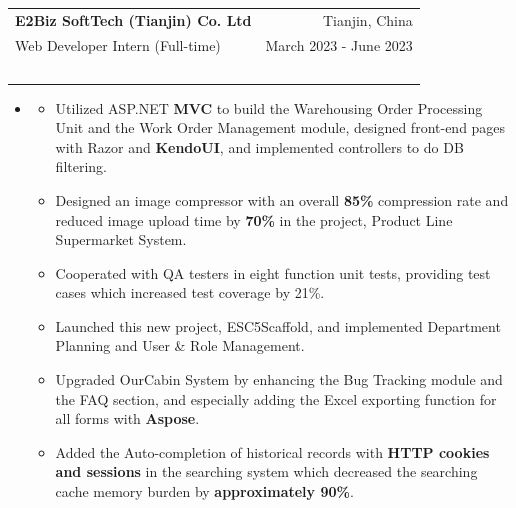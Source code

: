 \documentclass[a4paper,20pt]{article}
\makeatletter
\newcommand{\resumeResearchSubheading}[7]{
  \vspace{5pt}\item
    \begin{tabular*} {0.98\textwidth} {@{\hspace{-0.5em}}l@{\extracolsep{\fill}}r@{}}
      \textbf{#1} & {#2}\null \\
      {#3} & {#4} \\
      {#5} & {#6} \vspace*{4pt}
      {#7}
    \end{tabular*}
  \vspace{-6pt}
}
\newcommand{\resumeResearchItemListStart}{
  \begin{itemize} [leftmargin=*]
}
\newcommand{\resumeResearchItemListEnd}{
  \end{itemize}
  \vspace{-5pt}
}
\newcommand{\resumeResearchItem}[1]{
  \item{
    {#1 \vspace{-1pt}}
  }
}
\newcommand{\resumeResearchMidItemListStart}{
  \begin{itemize} [leftmargin=*]
}
\newcommand{\resumeResearchMidItemListEnd}{
  \end{itemize}
  \vspace{-5pt}
}
\newcommand{\resumeResearchMidItem}[2]{
  \item{
    \textbf{#1}
    {#2 \vspace{-2pt}}
  }
}
\makeatother
\begin{document}
\resumeResearchSubheading
{E2Biz SoftTech (Tianjin) Co. Ltd} {Tianjin, China}
{Web Developer Intern (Full-time)} {March 2023 - June 2023}
{} {}
\vspace{-14pt}
\resumeResearchMidItemListStart
\resumeResearchMidItem{}
{}
\vspace{-11pt}
{
  \resumeResearchItemListStart
  \resumeResearchItem{}
  {Utilized ASP.NET \textbf{MVC} to build the Warehousing Order Processing Unit and the Work Order Management module, designed front-end pages with Razor and \textbf{KendoUI}, and implemented controllers to do DB filtering.}
  \resumeResearchItem{}
  {Designed an image compressor with an overall \textbf{85\%} compression rate and reduced image upload time by \textbf{70\%} in the project, Product Line Supermarket System.}
  \resumeResearchItem{}
  {Cooperated with QA testers in eight function unit tests, providing test cases which increased test coverage by 21\%.}
  \resumeResearchItem{}
  {Launched this new project, ESC5Scaffold, and implemented Department Planning and User \& Role Management.}
  \resumeResearchItem{}
  {Upgraded OurCabin System by enhancing the Bug Tracking module and the FAQ section, and especially adding the Excel exporting function for all forms with \textbf{Aspose}.}
  \resumeResearchItem{}
  {Added the Auto-completion of historical records with \textbf{HTTP cookies and sessions} in the searching system which decreased the searching cache memory burden by \textbf{approximately 90\%}.}
  \resumeResearchItemListEnd
}
\resumeResearchMidItemListEnd

\end{document}
